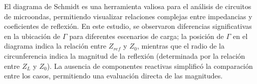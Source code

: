 \documentclass{article}   %
\theoremstyle{mytheoremstyle}
\theoremstyle{mytheoremstyle}
\theoremstyle{myproblemstyle}
\begin{document}
\begin{minipage}{0.49\textwidth}
        El diagrama de Schmidt es una herramienta valiosa para el análisis de circuitos de microondas, permitiendo visualizar
        relaciones complejas entre impedancias y coeficientes de reflexión. En este estudio, se observaron diferencias significativas en la
        ubicación de $\Gamma$ para diferentes escenarios de carga; la posición de $\Gamma$ en el diagrama indica la relación entre $Z_{ref}$ y $Z_{0}$,
        mientras que el radio de la circunferencia indica la magnitud de la reflexión (determinada por la relación entre $Z_{L}$ y $Z_{0}$).
        La ausencia de componentes reactivas simplificó la comparación entre los casos, permitiendo una evaluación directa de las magnitudes.
    \end{minipage}
\end{document}

